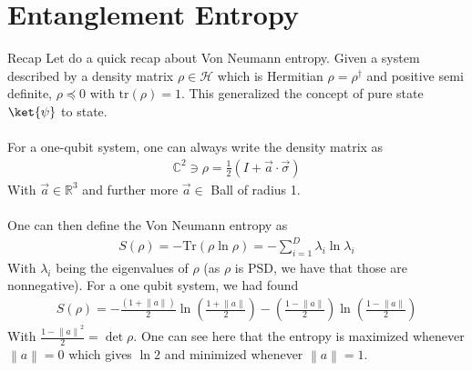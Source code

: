 \section{Entanglement Entropy}

\begin{parag}{Recap}
    Let do a quick recap about Von Neumann entropy. Given a system described by a density matrix $\rho \in \mathcal{H}$ which is Hermitian $\rho = \rho^{\dagger}$ and positive semi definite, $\rho \preceq 0$ with $\text{tr}\left(\rho\right)= 1$. This generalized the concept of pure state $\ket{\psi}$ to  state.\\
	$ $\\
	For a one-qubit system, one can always write the density matrix as 
	\begin{align*} 
		\mathbb{C}^2 \ni \rho = \frac{1}{2}\left(I + \vec{a}\cdot \vec{\sigma}\right)
	\end{align*}
	With $\vec{a} \in \mathbb{R}^3$ and further more $\vec{a} \in$ Ball of radius 1.\\
	$ $\\
	One can then define the Von Neumann entropy as 
	\begin{align*} 
		S\left(\rho\right) = - \text{Tr}\left(\rho \ln \rho\right)  =  - \sum_{i= 1}^{D} \lambda_i \ln \lambda_i
	\end{align*}
	With $\lambda_i$ being the eigenvalues of $\rho$ (as $\rho$ is PSD, we have that those are nonnegative). For a one qubit system, we had found 
	\begin{align*} 
		S\left(\rho\right) = - \frac{\left(1 + \left\|a\right\|\right)}{2}\ln\left(\frac{1 + \left\|a\right\|}{2}\right) - \left(\frac{1 - \left\|a\right\|}{2}\right)\ln\left(\frac{1 - \left\|a\right\|}{2}\right) 
	\end{align*}
	With $\frac{1 - \left\|a\right\|^2}{2} = \det \rho$. One can see here that the entropy is maximized whenever $\left\|a\right\|= 0$ which gives $\ln 2$ and minimized whenever $\left\|a\right\|= 1$.
	
\end{parag}


